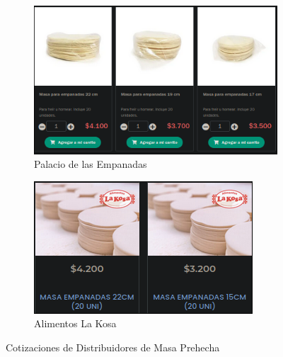 \documentclass[12pt]{article}
\begin{document}
        \begin{figure}[H] %
            \centering %
            \begin{subfigure}{0.35\textwidth}
                \centering
                \includegraphics[width=0.9\linewidth]{palaci} %
                \caption{Palacio de las Empanadas}
                \label{fig:palacio}
            \end{subfigure}
            \hfill %
            \begin{subfigure}{0.35\textwidth}
                \centering
                \includegraphics[width=0.9\linewidth]{kosa} %
                \caption{Alimentos La Kosa}
                \label{fig:kosa}
            \end{subfigure}
            \caption{Cotizaciones de Distribuidores de Masa Prehecha}
            \label{fig:cotizaciones_masas}
        \end{figure} %
\end{document}
